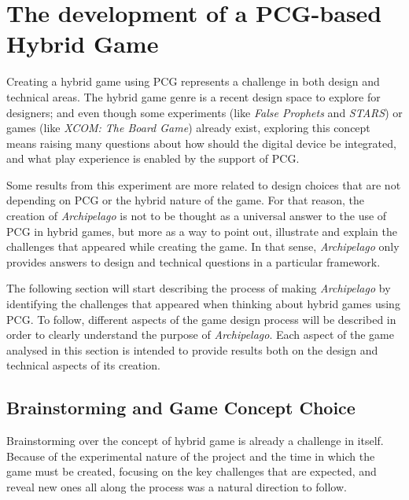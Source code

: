 \chapter{The development of a PCG-based Hybrid Game}
Creating a hybrid game using PCG represents a challenge in both design and technical areas. The hybrid game genre is a recent design space to explore for designers; and even though some experiments (like \textit{False Prophets} and \textit{STARS}) or games (like \textit{XCOM: The Board Game}) already exist, exploring this concept means raising many questions about how should the digital device be integrated, and what play experience is enabled by the support of PCG.

Some results from this experiment are more related to design choices that are not depending on PCG or the hybrid nature of the game. For that reason, the creation of \textit{Archipelago} is not to be thought as a universal answer to the use of PCG in hybrid games, but more as a way to point out, illustrate and explain the challenges that appeared while creating the game. In that sense, \textit{Archipelago} only provides answers to design and technical questions in a particular framework.

The following section will start describing the process of making \textit{Archipelago} by identifying the challenges that appeared when thinking about hybrid games using PCG. To follow, different aspects of the game design process will be described in order to clearly understand the purpose of \textit{Archipelago}. Each aspect of the game analysed in this section is intended to provide results both on the design and technical aspects of its creation. 
\section{Brainstorming and Game Concept Choice}
Brainstorming over the concept of hybrid game is already a challenge in itself. Because of the experimental nature of the project and the time in which the game must be created, focusing on the key challenges that are expected, and reveal new ones all along the process was a natural direction to follow.
